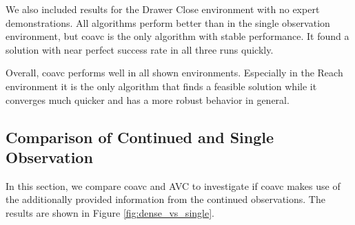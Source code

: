 We also included results for the Drawer Close environment with no expert demonstrations. All algorithms perform better than in the single observation environment, 
but \ac{coavc} is the only algorithm with stable performance. It found a solution with near perfect success rate in all three runs quickly.

Overall, \ac{coavc} performs well in all shown environments. Especially in the Reach environment it is the only algorithm that finds a feasible solution while it 
converges much quicker and has a more robust behavior in general. 






\subsection{Comparison of Continued and Single Observation}
\label{sec:com_coavc_avc}
In this section, we compare \ac{coavc} and AVC to investigate if \ac{coavc} makes use of the additionally provided information from the continued observations. 
The results are shown in Figure \ref{fig:dense_vs_single}.


